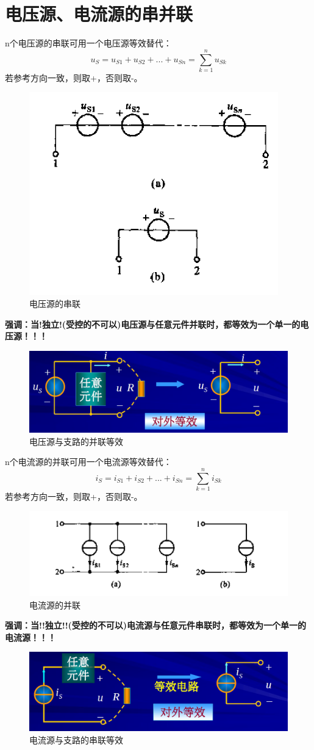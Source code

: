 \documentclass[11pt,a4paper,oneside]{book}
\begin{document}
\section{电压源、电流源的串并联}
n个电压源的串联可用一个电压源等效替代：
\begin{equation}
	u_S=u_{S1}+u_{S2}+...+u_{Sn}=\sum_{k=1}^{n} u_{Sk}
\end{equation}
若参考方向一致，则取+，否则取-。
\begin{figure}[H]
	\centering
	\includegraphics[width=0.4\linewidth]{screenshot014}
	\caption{电压源的串联}
	\label{fig:screenshot014}
\end{figure}
\noindent\textbf{强调：当!独立!(受控的不可以)电压源与任意元件并联时，都等效为一个单一的电压源！！！}
\begin{figure}[H]
	\centering
	\includegraphics[width=0.5\linewidth]{screenshot021}
	\caption{电压源与支路的并联等效}
	\label{fig:screenshot021}
\end{figure}

n个电流源的并联可用一个电流源等效替代：
\begin{equation}
	i_S=i_{S1}+i_{S2}+...+i_{Sn}=\sum_{k=1}^{n} i_{Sk}
\end{equation}
若参考方向一致，则取+，否则取-。
\begin{figure}[H]
	\centering
	\includegraphics[width=0.5\linewidth]{screenshot015}
	\caption{电流源的并联}
	\label{fig:screenshot015}
\end{figure}
\noindent\textbf{强调：当!!独立!!(受控的不可以)电流源与任意元件串联时，都等效为一个单一的电流源！！！}
\begin{figure}[H]
	\centering
	\includegraphics[width=0.5\linewidth]{screenshot022}
	\caption{电流源与支路的串联等效}
	\label{fig:screenshot022}
\end{figure}
\end{document}
